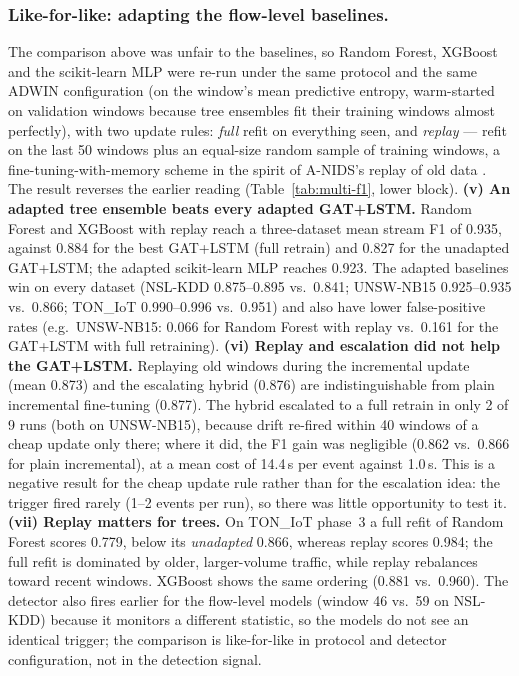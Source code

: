 \documentclass[twocolumn]{llncs}
\begin{document}
\subsubsection{Like-for-like: adapting the flow-level baselines.} The comparison above was
unfair to the baselines, so Random Forest, XGBoost and the scikit-learn MLP were re-run under the
same protocol and the same ADWIN configuration (on the window's mean predictive entropy, warm-started
on validation windows because tree ensembles fit their training windows almost perfectly), with two
update rules: \emph{full} refit on everything seen, and \emph{replay} --- refit on the last 50
windows plus an equal-size random sample of training windows, a fine-tuning-with-memory scheme
\cite{cerasuolo2025adaptable} in the spirit of A-NIDS's replay of old data \cite{zha2025anids}.
The result reverses the earlier reading (Table~\ref{tab:multi-f1}, lower block). \textbf{(v) An
adapted tree ensemble beats every adapted GAT+LSTM.} Random Forest and XGBoost with replay reach a
three-dataset mean stream F1 of 0.935, against 0.884 for the best GAT+LSTM (full retrain) and 0.827
for the unadapted GAT+LSTM; the adapted scikit-learn MLP reaches 0.923. The adapted baselines win on
every dataset (NSL-KDD 0.875--0.895 vs.\ 0.841; UNSW-NB15 0.925--0.935 vs.\ 0.866; TON\_IoT
0.990--0.996 vs.\ 0.951) and also have lower false-positive rates (e.g.\ UNSW-NB15: 0.066 for
Random Forest with replay vs.\ 0.161 for the GAT+LSTM with full retraining). \textbf{(vi) Replay and
escalation did not help the GAT+LSTM.} Replaying old windows during the incremental update (mean
0.873) and the escalating hybrid (0.876) are indistinguishable from plain incremental fine-tuning
(0.877). The hybrid escalated to a full retrain in only 2 of 9 runs (both on UNSW-NB15), because
drift re-fired within 40 windows of a cheap update only there; where it did, the F1 gain was
negligible (0.862 vs.\ 0.866 for plain incremental), at a mean cost of 14.4\,s per event against
1.0\,s. This is a negative result for the cheap update rule rather than for the escalation idea: the
trigger fired rarely (1--2 events per run), so there was little opportunity to test it.
\textbf{(vii) Replay matters for trees.} On TON\_IoT phase~3 a full refit of Random Forest scores
0.779, below its \emph{unadapted} 0.866, whereas replay scores 0.984; the full refit is dominated by
older, larger-volume traffic, while replay rebalances toward recent windows. XGBoost shows the same
ordering (0.881 vs.\ 0.960). The detector also fires earlier for the flow-level models (window 46
vs.\ 59 on NSL-KDD) because it monitors a different statistic, so the models do not see an identical
trigger; the comparison is like-for-like in protocol and detector configuration, not in the
detection signal.
\end{document}
